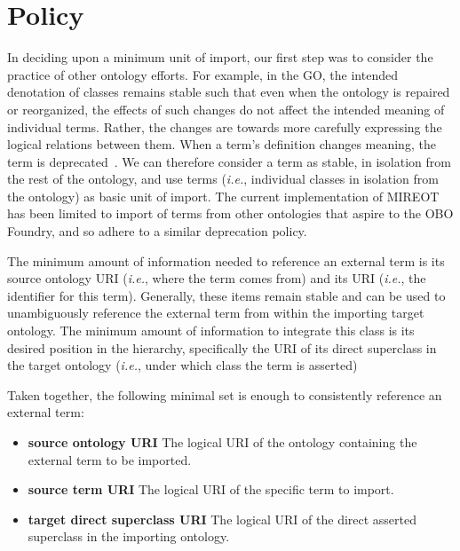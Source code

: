 \documentclass{ao2e}%
\begin{document}
\section{Policy}

In deciding upon a minimum unit of import, our first step was to consider the practice of other ontology efforts.
For example, in the \ac{GO}, the intended denotation of classes remains stable such that even when the ontology is repaired or reorganized, the effects of such changes do not affect the intended meaning of individual terms.
Rather, the changes are towards more carefully expressing the logical relations between them.
When a term's definition changes meaning, the term is deprecated~\cite{GOGuide}.
We can therefore consider a term as stable, in isolation from the rest of the ontology, and use terms (\emph{i.e.}, individual classes in isolation from the ontology) as basic unit of import.
The current implementation of \ac{MIREOT} has been limited to import of terms from other ontologies that aspire to the OBO Foundry, and so adhere to a similar deprecation policy.

The minimum amount of information needed to reference an external term is its source ontology URI (\textit {i.e.}, where the term comes from) and its URI (\textit {i.e.}, the identifier for this term). 
Generally, these items remain stable and can be used to unambiguously reference the external term from within the importing target ontology.
The minimum amount of information to integrate this class is its desired position in the hierarchy, specifically the URI of its direct superclass in the target ontology (\textit {i.e.}, under which class the term is asserted)

Taken together, the following minimal set is enough to consistently reference an external term:
\begin{itemize}
 \item \textbf{source ontology URI} The logical URI of the ontology containing the external term to be imported. 
 \item \textbf{source term URI} The logical URI of the specific term to import. 
 \item \textbf{target direct superclass URI} The logical URI of the direct asserted superclass in the importing ontology.
\end{itemize} 
\end{document}
